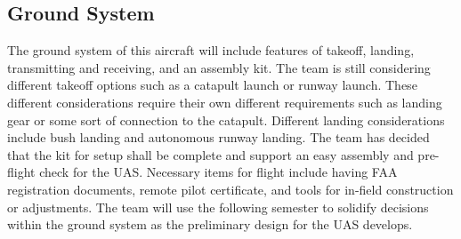 ﻿\documentclass{article}
\begin{document}
\subsection{Ground System}
\noindent The ground system of this aircraft will include features of takeoff, landing, transmitting and receiving, and an assembly kit. The team is still considering different takeoff options such as a catapult launch or runway launch. These different considerations require their own different requirements such as landing gear or some sort of connection to the catapult. Different landing considerations include bush landing and autonomous runway landing. The team has decided that the kit for setup shall be complete and support an easy assembly and pre-flight check for the UAS. Necessary items for flight include having FAA registration documents, remote pilot certificate, and tools for in-field construction or adjustments. The team will use the following semester to solidify decisions within the ground system as the preliminary design for the UAS develops. \\


\end{document}
